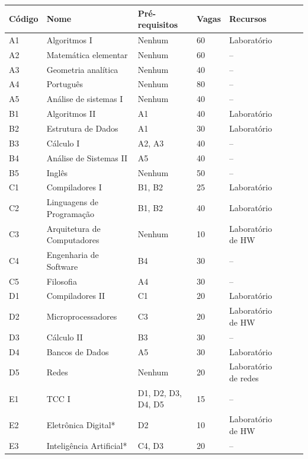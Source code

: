 \begin{table}\centering\footnotesize
  \begin{tabular*}{1\textwidth}{@{}lllllll@{}}
    \toprule
    Código & Nome & Pré-requisitos & Vagas & Recursos \\
    \midrule
    A1 & Algoritmos I           & Nenhum & 60 & Laboratório \\
    A2 & Matemática elementar   & Nenhum & 60 & -- \\
    A3 & Geometria analítica    & Nenhum & 40 & -- \\
    A4 & Português              & Nenhum & 80 & -- \\
    A5 & Análise de sistemas I  & Nenhum & 40 & -- \\
    \midrule
    B1 & Algoritmos II          & A1 & 40 & Laboratório \\
    B2 & Estrutura de Dados     & A1 & 30 & Laboratório \\
    B3 & Cálculo I              & A2, A3 & 40 & -- \\
    B4 & Análise de Sistemas II & A5 & 40 & -- \\
    B5 & Inglês                 & Nenhum & 50 & -- \\
    \midrule
    C1 & Compiladores I         & B1, B2 & 25 & Laboratório \\
    C2 & Linguagens de Programação & B1, B2 & 40 & Laboratório \\
    C3 & Arquitetura de Computadores & Nenhum & 10 & Laboratório de HW \\
    C4 & Engenharia de Software & B4 & 30 & -- \\
    C5 & Filosofia              & A4 & 30 & -- \\
    \midrule
    D1 & Compiladores II        & C1 & 20 & Laboratório \\
    D2 & Microprocessadores     & C3 & 20 & Laboratório de HW \\
    D3 & Cálculo II             & B3 & 30 & -- \\
    D4 & Bancos de Dados        & A5 & 30 & Laboratório \\
    D5 & Redes                  & Nenhum & 20 & Laboratório de redes \\
    \midrule
    E1 & TCC I                  & D1, D2, D3, D4, D5 & 15 & -- \\
    E2 & Eletrônica Digital*    & D2 & 10 & Laboratório de HW \\
    E3 & Inteligência Artificial* & C4, D3 & 20 & -- \\

\end{tabular*}
\end{table}
